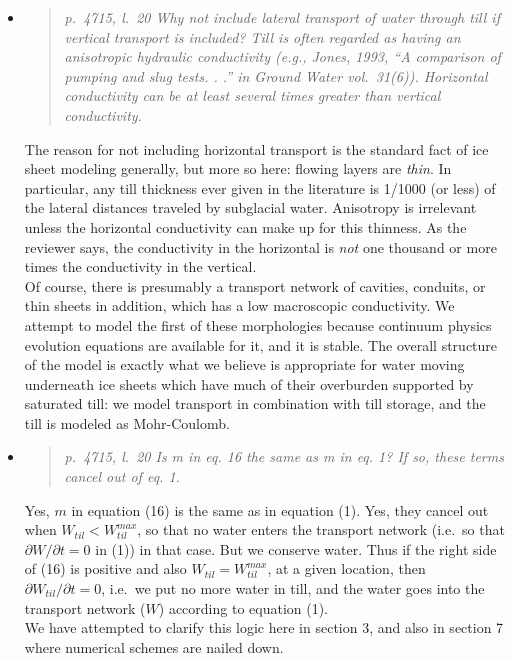\documentclass[11pt,reqno]{amsart}
\newcommand{\reply}[2]{
\medskip\medskip
\item  \begin{quote}
\emph{#1}
\end{quote}

\medskip
\noindent #2}
\begin{document}
\begin{itemize}
\reply{p.~4715, l.~20 Why not include lateral transport of water through till if vertical transport is included?  Till is often regarded as having an anisotropic hydraulic conductivity (e.g., Jones, 1993, ``A comparison of pumping and slug tests. . .'' in Ground Water vol.~31(6)).  Horizontal conductivity can be at least several times greater than vertical conductivity.}
{The reason for not including horizontal transport is the standard fact of ice sheet modeling generally, but more so here: flowing layers are \emph{thin}.  In particular, any till thickness ever given in the literature is 1/1000 (or less) of the lateral distances traveled by subglacial water.  Anisotropy is irrelevant unless the horizontal conductivity can make up for this thinness.  As the reviewer says, the conductivity in the horizontal is \emph{not} one thousand or more times the conductivity in the vertical.\\
\indent Of course, there is presumably a transport network of cavities, conduits, or thin sheets in addition, which has a low macroscopic conductivity.  We attempt to model the first of these morphologies because continuum physics evolution equations are available for it, and it is stable.  The overall structure of the model is exactly what we believe is appropriate for water moving underneath ice sheets which have much of their overburden supported by saturated till: we model transport in combination with till storage, and the till is modeled as Mohr-Coulomb.}

\reply{p.~4715, l.~20 Is m in eq. 16 the same as m in eq. 1?  If so, these terms cancel out of
eq. 1.}
{Yes, $m$ in equation (16) is the same as in equation (1).  Yes, they cancel out when $W_{til}< W_{til}^{max}$, so that no water enters the transport network (i.e.~so that $\partial W/\partial t=0$ in (1)) in that case.  But we conserve water.  Thus if the right side of (16) is positive and also $W_{til} = W_{til}^{max}$, at a given location, then $\partial W_{til}/\partial t=0$, i.e.~we put no more water in till, and the water goes into the transport network ($W$) according to equation (1). \\
\indent We have attempted to clarify this logic here in section 3, and also in section 7 where numerical schemes are nailed down.}


\end{itemize}
\end{document}
